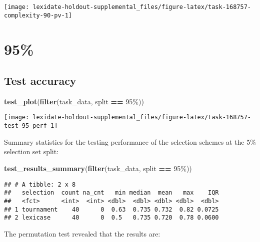 \documentclass[
]{book}
\newenvironment{Shaded}{\begin{snugshade}}{\end{snugshade}}
\newcommand{\FunctionTok}[1]{\textcolor[rgb]{0.13,0.29,0.53}{\textbf{#1}}}
\newcommand{\NormalTok}[1]{#1}
\newcommand{\SpecialCharTok}[1]{\textcolor[rgb]{0.81,0.36,0.00}{\textbf{#1}}}
\newcommand{\StringTok}[1]{\textcolor[rgb]{0.31,0.60,0.02}{#1}}
\begin{document}
\texttt{[image: lexidate-holdout-supplemental\_files/figure-latex/task-168757-complexity-90-pv-1]}

\hypertarget{section-24}{%
\section{95\%}\label{section-24}}

\hypertarget{test-accuracy-24}{%
\subsection{Test accuracy}\label{test-accuracy-24}}

\begin{Shaded}
\begin{Highlighting}[]
\FunctionTok{test\_plot}\NormalTok{(}\FunctionTok{filter}\NormalTok{(task\_data, split }\SpecialCharTok{==} \StringTok{\textquotesingle{}95\%\textquotesingle{}}\NormalTok{))}
\end{Highlighting}
\end{Shaded}

\texttt{[image: lexidate-holdout-supplemental\_files/figure-latex/task-168757-test-95-perf-1]}

Summary statistics for the testing performance of the selection schemes at the 5\% selection set split:

\begin{Shaded}
\begin{Highlighting}[]
\FunctionTok{test\_results\_summary}\NormalTok{(}\FunctionTok{filter}\NormalTok{(task\_data, split }\SpecialCharTok{==} \StringTok{\textquotesingle{}95\%\textquotesingle{}}\NormalTok{))}
\end{Highlighting}
\end{Shaded}

\begin{verbatim}
## # A tibble: 2 x 8
##   selection  count na_cnt   min median  mean   max    IQR
##   <fct>      <int>  <int> <dbl>  <dbl> <dbl> <dbl>  <dbl>
## 1 tournament    40      0  0.63  0.735 0.732  0.82 0.0725
## 2 lexicase      40      0  0.5   0.735 0.720  0.78 0.0600
\end{verbatim}

The permutation test revealed that the results are:
\end{document}
